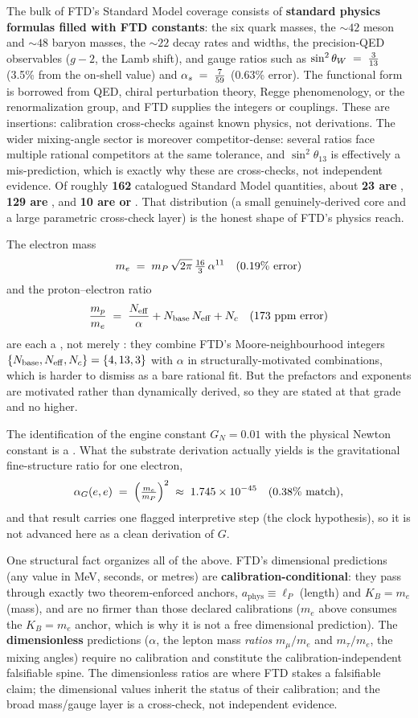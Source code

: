  The bulk of FTD's
Standard Model coverage consists of \textbf{standard physics formulas filled with
FTD constants}: the six quark masses, the ${\sim}42$ meson and ${\sim}48$
baryon masses, the ${\sim}22$ decay rates and widths, the precision-QED
observables ($g-2$, the Lamb shift), and gauge ratios such as $\sin^{2}\theta_W \;=\; \tfrac{3}{13}$ (3.5\%
from the on-shell value) and $\alpha_s \;=\; \tfrac{7}{59}$ (0.63\% error). The functional form is borrowed from
QED, chiral perturbation theory, Regge phenomenology, or the renormalization
group, and FTD supplies the integers or couplings. These are 
insertions: calibration cross-checks against known physics, not derivations. The
wider mixing-angle sector is moreover competitor-dense: several ratios face
multiple rational competitors at the same tolerance, and $\sin^2\theta_{13}$ is
effectively a mis-prediction, which is exactly why these are cross-checks, not
independent evidence. Of roughly \textbf{162} catalogued Standard Model
quantities, about \textbf{23 are }, \textbf{129 are }, and
\textbf{10 are  or }. That distribution (a small
genuinely-derived core and a large parametric cross-check layer) is the
honest shape of FTD's physics reach.

 The
electron mass
\[ m_e \;=\; m_P\,\sqrt{2\pi}\,\tfrac{16}{3}\,\alpha^{11} \quad(0.19\%\text{ error}) \]
and the proton--electron ratio
\[ \frac{m_p}{m_e} \;=\; \frac{N_{\mathrm{eff}}}{\alpha} + N_{\mathrm{base}}\,N_{\mathrm{eff}} + N_c \quad(173\text{ ppm error}) \]
are each a , not merely : they combine FTD's
Moore-neighbourhood integers $\{N_{\mathrm{base}},N_{\mathrm{eff}},N_c\}=\{4,13,3\}$ with $\alpha$ in
structurally-motivated combinations, which is harder to dismiss as a bare rational
fit. But the prefactors and exponents are motivated rather than dynamically
derived, so they are stated at that grade and no higher.

 The identification of the engine constant $G_N=0.01$
with the physical Newton constant is a . What the substrate derivation
actually yields is the gravitational fine-structure ratio for one electron,
\[ \alpha_G(e,e) \;=\; \Bigl(\tfrac{m_e}{m_P}\Bigr)^{2} \;\approx\; 1.745\times 10^{-45} \quad(0.38\%\text{ match}), \]
and that result carries one flagged interpretive step (the clock hypothesis), so
it is not advanced here as a clean derivation of $G$.

 One
structural fact organizes all of the above. FTD's dimensional predictions (any
value in MeV, seconds, or metres) are \textbf{calibration-conditional}: they pass
through exactly two theorem-enforced anchors, $a_{\mathrm{phys}}\equiv\ell_P$
(length) and $K_B=m_e$ (mass), and are no firmer than those declared calibrations
($m_e$ above consumes the $K_B=m_e$ anchor, which is why it is not a free
dimensional prediction). The \textbf{dimensionless} predictions ($\alpha$, the
lepton mass \emph{ratios} $m_\mu/m_e$ and $m_\tau/m_e$, the mixing
angles) require no calibration and constitute the calibration-independent
falsifiable spine. The dimensionless ratios are where FTD stakes a falsifiable
claim; the dimensional values inherit the status of their calibration; and the
broad mass/gauge layer is a  cross-check, not independent evidence.
